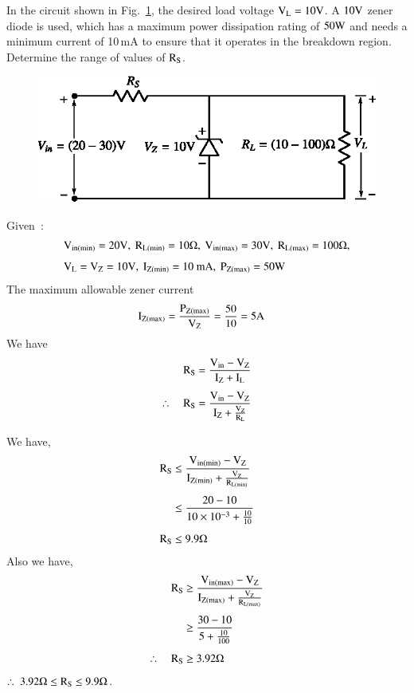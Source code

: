 \begin{problem}\label{prob1.32}
In the circuit shown in Fig.~\ref{fig1.50}, the desired load voltage $\textrm{V}_{\textrm{L}}=10\textrm{V}$. A $10\textrm{V}$ zener diode is used, which has a maximum power dissipation rating of $50\textrm{W}$ and needs a minimum current of 10\,mA to ensure that it operates in the breakdown region. Determine the range of values of $\textrm{R}_{\textrm{S}}$.
\begin{figure}[H]
\centering
\includegraphics{chap1/fig1.50.eps}
\caption{}\label{fig1.50}
\end{figure}
\end{problem}

\begin{solution}
Given~:
\begin{align*}
& \rmV_{\text{in}(\min)}=20\rmV, \ \rmR_{\rmL(\min)}=10\Omega, \ \rmV_{\text{in}(\max)}=30\rmV, \ \rmR_{\rmL(\max)}=100\Omega,\\[4pt]
& \rmV_{\rmL}=\rmV_{\rmZ}=10\rmV, \ \rmI_{\rmZ(\min)}=10\text{~mA}, \ \rmP_{\rmZ(\max)}=50\rmW
\end{align*}
The maximum allowable zener current
\begin{align*}
\textrm{I}_{\textrm{Z}(\max)} &= \frac{\textrm{P}_{\textrm{Z}(\max)}}{\textrm{V}_{\textrm{Z}}}= \frac{50}{10}= 5\textrm{A}
\end{align*}
We have
\begin{align*}
\textrm{R}_{\textrm{S}} &= \frac{\textrm{V}_{\text{in}}-\textrm{V}_{\textrm{Z}}}{\textrm{I}_{\textrm{Z}}+\textrm{I}_{\textrm{L}}}\\[4pt]
\therefore\quad \textrm{R}_{\textrm{S}} &= \frac{\textrm{V}_{\text{in}}-\textrm{V}_{\textrm{Z}}}{\textrm{I}_{\textrm{Z}}+\frac{\textrm{V}_{\textrm{Z}}}{\textrm{R}_{\textrm{L}}}}
\end{align*}

We have,
\begin{align*}
\textrm{R}_{\textrm{S}} &\leq \dfrac{\textrm{V}_{\text{in}(\min)}-\textrm{V}_{\textrm{Z}}}{\textrm{I}_{\textrm{Z}(\min)}+\frac{\textrm{V}_{\textrm{Z}}}{\textrm{R}_{\textrm{L}(\min)}}}\\[4pt]
&\leq \dfrac{20-10}{10\times 10^{-3}+\frac{10}{10}}\\[4pt]
\textrm{R}_{\textrm{S}} &\leq 9.9\Omega
\end{align*}
Also we have,
\begin{align*}
\textrm{R}_{\textrm{S}} &\geq \dfrac{\textrm{V}_{\text{in}(\max)}-\textrm{V}_{\textrm{Z}}}{\textrm{I}_{\textrm{Z}(\max)}+\frac{\textrm{V}_{\textrm{Z}}}{\textrm{R}_{\textrm{L}(\max)}}}\\[4pt]
&\geq \dfrac{30-10}{5+\frac{10}{100}}\\[4pt]
\therefore\quad \textrm{R}_{\textrm{S}} &\geq 3.92\Omega
\end{align*}
$\therefore~ 3.92\Omega\leq \textrm{R}_{\textrm{S}}\leq 9.9\Omega$.
\end{solution}

